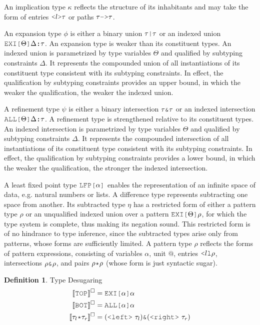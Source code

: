 \documentclass[acmsmall]{acmart}
\theoremstyle{definition}
\newtheorem{definition}{Definition}[section]
\begin{document}
An implication type $\kappa$ reflects the structure of 
its inhabitants and may take the form of  
entries $\J{<}l\J{>}\tau$ or paths $\tau \J{->} \tau$.

An expansion type $\phi$ is either a binary union $\tau \J{|} \tau$ or 
an indexed union $\J{EXI[}\Theta \J{]} \Delta \J{:} \tau$.
An expansion type is weaker than its constituent types. 
An indexed union is parametrized by type variables $\Theta$ 
and qualified by subtyping constraints $\Delta$.
It represents the compounded union of all instantiations of its constituent type 
consistent with its subtyping constraints.
In effect, the qualification by subtyping constraints provides an upper bound, in which
the weaker the qualification, the weaker the indexed union.

A refinement type $\psi$ is either a binary intersection $\tau \J{\&} \tau$ or 
an indexed intersection $\J{ALL[} \Theta \J{]} \Delta \J{:}\tau$.
A refinement type is strengthened relative to its constituent types. 
An indexed intersection is parametrized by type variables $\Theta$ 
and qualified by subtyping constraints $\Delta$.
It represents the compounded intersection of all instantiations of its constituent type 
consistent with its subtyping constraints.
In effect, the qualification by subtyping constraints provides a lower bound, in which
the weaker the qualification, the stronger the indexed intersection.

A least fixed point type $\J{LFP[}\alpha \J{]}$ 
enables the representation of an infinite space of data,
e.g. natural numbers or lists. 
A difference type represents subtracting one space from another.
Its subtracted type $\eta$ has a restricted form of either
a pattern type $\rho$ or an unqualified indexed union 
over a pattern $\J{EXI[}\Theta \J{]} \rho$, for which the type system
is complete, thus making its negation sound.  
This restricted form is of no hindrance to type inference, since the 
subtracted types arise only from patterns, whose forms are sufficiently
limited.
A pattern type $\rho$ reflects the forms of pattern expressions, consisting of 
variables $\alpha$, unit $@$, entries $\J{<} l \J{l} \rho$, intersections $\rho \J{\&} \rho$,
and pairs $\rho \J{*} \rho$ (whose form is just syntactic sugar).


\begin{definition} 
  \label{def:type_desugaring}
  Type Desugaring 
  \hfill 
  \small
  \boxed{\llbracket \gamma \rrbracket^\square = \tau}
  \\
  \begin{align*}
    \llbracket \J{TOP} \rrbracket^\square &= \J{EXI[} \alpha \J{]} \alpha
    \\
    \llbracket \J{BOT} \rrbracket^\square &= \J{ALL[} \alpha \J{]} \alpha
    \\
    \llbracket \tau_l \J{*} \tau_r \rrbracket^\square &= (\J{<left>}\ \tau_l)  \J{\&} (\J{<right>}\ \tau_r)
  \end{align*}
\end{definition} 
\end{document}

